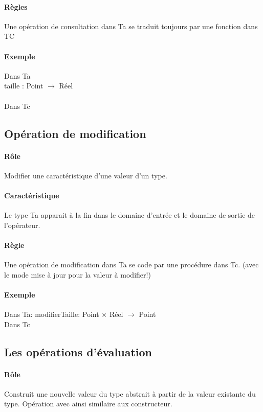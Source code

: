 					 \paragraph{Règles}
						Une opération de consultation dans Ta se traduit toujours par une fonction dans TC
					\paragraph{Exemple}
						Dans Ta \\
						taille : Point $\rightarrow$ Réel	\\ \\
						Dans Tc\\
					
				\subsection{Opération de modification}
					\paragraph{Rôle}
						Modifier une caractéristique d'une valeur d'un type.
					\paragraph{Caractéristique}
						Le type Ta apparait à la fin dans le domaine d'entrée et le domaine de sortie de l'opérateur. 
					\paragraph{Règle}
						Une opération de modification dans Ta se code par une procédure dans Tc. 
						(avec le mode mise à jour pour la valeur à modifier!)
					\paragraph{Exemple}
						Dans Ta: modifierTaille: Point $\times$ Réel $\rightarrow$ Point \\
						Dans Tc
						
				\subsection{Les opérations d'évaluation}
					\paragraph{Rôle}
						Construit une nouvelle valeur du type abstrait à partir de la valeur existante du
						type. Opération avec ainsi similaire aux constructeur.
